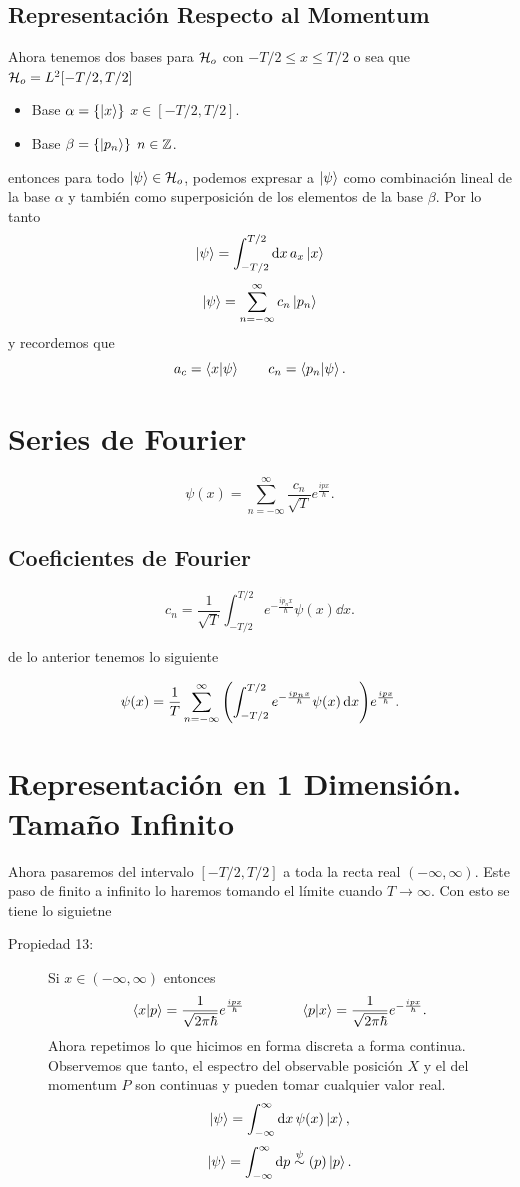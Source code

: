 \subsection{Representación Respecto al Momentum}
Ahora tenemos dos bases para $\mathcal{H} _o$ con $-T/2 \leq x \leq T/2$ o sea que $\mathcal{H} _o = L^2 [-T/2,T/2]$
    \begin{itemize}
        \item Base $\alpha = \{ \ket{x} \}$ $x\in [-T/2, T/2]$.
        \item Base $\beta = \{ \ket{p_n} \}$ $n\in \mathbb{Z}$.
    \end{itemize}
entonces para todo $\ket{\psi} \in \mathcal{H} _o$, podemos expresar a $\ket{\psi}$ como combinación lineal de la base $\alpha$ y también como superposición de los elementos de la base $\beta$. Por lo tanto
    $$ \ket{\psi} = \int _{-T/2} ^{T/2} \dd{x} a_x \ket{x} $$
    $$ \ket{\psi} = \sum _{n = -\infty} ^\infty c_n \ket{p_n} $$
y recordemos que
    $$ a_c =  \braket{x}{\psi} \qquad c_n = \braket{p_n}{\psi}. $$

\section{Series de Fourier}
    $$ \psi (x) = \sum _{n = -\infty} ^\infty \frac{c_n}{\sqrt{T}} e^{\frac{ipx}{\hbar}}. $$

\subsection{Coeficientes de Fourier}
    $$ c_n = \frac{1}{\sqrt{T}} \int _{-T/2} ^{T/2} e^{-\frac{ip_n x}{\hbar}} \psi (x) \dd{x}. $$

de lo anterior tenemos lo siguiente

    $$ \psi (x) = \frac{1}{T} \sum _{n = -\infty} ^\infty \qty(\int _{-T/2} ^{T/2} e^{-\frac{ip_n x}{\hbar}} \psi (x) \dd{x}) e^{\frac{ipx}{\hbar}}. $$

\section{Representación en 1 Dimensión. Tamaño Infinito}
Ahora pasaremos del intervalo $[-T/2,T/2]$ a toda la recta real $(-\infty ,\infty)$. Este paso de finito a infinito lo haremos tomando el límite cuando $T\to \infty$. Con esto se tiene lo siguietne

\begin{description}
    \item[Propiedad 13: ] Si $x\in (-\infty ,\infty)$ entonces
        $$ \braket{x}{p} = \frac{1}{\sqrt{2\pi \hbar}} e^{\frac{ipx}{\hbar}} \qquad \qquad \braket{p}{x} = \frac{1}{\sqrt{2\pi \hbar}} e^{-\frac{ipx}{\hbar}}. $$
    Ahora repetimos lo que hicimos en forma discreta a forma continua. Observemos que tanto, el espectro del observable posición $X$ y el del momentum $P$ son continuas y pueden tomar cualquier valor real.
        $$ \ket{\psi} = \int _{-\infty} ^\infty \dd{x} \psi (x) \ket{x}, $$
        $$ \ket{\psi} = \int _{-\infty} ^\infty \dd{p} \overset{\psi}{\sim} (p) \ket{p}. $$
\end{description}

